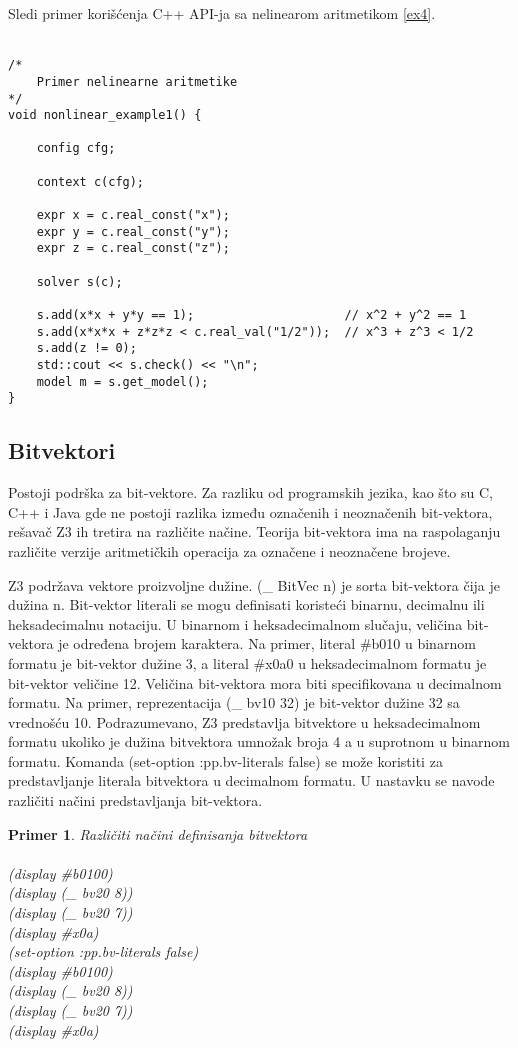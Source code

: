 \documentclass[12pt,oneside]{memoir}
\newtheorem{primer}{Primer}
\begin{document}
Sledi primer korišćenja C++ API-ja sa nelinearom aritmetikom \ref{ex4}. 
\\ \\
\begin{lstlisting}
/*
	Primer nelinearne aritmetike
*/
void nonlinear_example1() {

    config cfg;

    context c(cfg);

    expr x = c.real_const("x");
    expr y = c.real_const("y");
    expr z = c.real_const("z");
                     
    solver s(c);

    s.add(x*x + y*y == 1);                     // x^2 + y^2 == 1
    s.add(x*x*x + z*z*z < c.real_val("1/2"));  // x^3 + z^3 < 1/2
    s.add(z != 0);
    std::cout << s.check() << "\n";
    model m = s.get_model();
}

\end{lstlisting}

\subsection{Bitvektori}
Postoji podrška za bit-vektore. Za razliku od programskih jezika, kao što su C, C++ i Java gde ne postoji razlika između označenih i neoznačenih bit-vektora, rešavač Z3 ih tretira na različite načine. Teorija bit-vektora ima na raspolaganju različite verzije aritmetičkih operacija za označene i neoznačene brojeve.

Z3 podržava vektore proizvoljne dužine. (\_ BitVec n) je sorta bit-vektora čija je dužina n. Bit-vektor literali se mogu definisati koristeći binarnu, decimalnu ili heksadecimalnu notaciju. U binarnom i heksadecimalnom slučaju, veličina bit-vektora je određena brojem karaktera. Na primer, literal \#b010 u binarnom formatu je bit-vektor dužine 3, a literal \#x0a0 u heksadecimalnom formatu je bit-vektor veličine 12. Veličina bit-vektora mora biti specifikovana u decimalnom formatu. Na primer, reprezentacija (\_ bv10 32) je bit-vektor dužine 32 sa vrednošću 10. Podrazumevano, Z3 predstavlja bitvektore u heksadecimalnom formatu ukoliko je dužina bitvektora umnožak broja 4 a u suprotnom u binarnom formatu. Komanda 
(set-option :pp.bv-literals false) se može koristiti za predstavljanje literala bitvektora u decimalnom formatu. U nastavku se navode različiti načini predstavljanja bit-vektora.
\begin{primer} Različiti načini definisanja bitvektora\\
\\(display \#b0100)
\\(display (\_ bv20 8))
\\(display (\_ bv20 7))
\\(display \#x0a) 
\\(set-option :pp.bv-literals false)
\\(display \#b0100)
\\(display (\_ bv20 8))
\\(display (\_ bv20 7))
\\(display \#x0a)
\end{primer}
\end{document}
